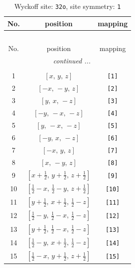 \documentclass[fleqn,8pt]{jsarticle}
\begin{document}
\renewcommand{\arraystretch}{1.2}
\begin{longtable}{ccc}
\caption{Wyckoff site: {\tt 32o}, site symmetry: {\tt 1}}
 \\
 \hline \hline
No. & position & mapping \\ \hline \endfirsthead

\multicolumn{2}{l}{\tablename\ \thetable{}} \\
 \hline \hline
No. & position & mapping \\ \hline \endhead

 \hline \hline
\multicolumn{2}{r}{\footnotesize\it continued ...} \\ \endfoot

 \hline \hline
\multicolumn{2}{r}{} \\ \endlastfoot

1 & $\left[ x,\, y,\, z \right]$ & {\tt [1]} \\ \hline
2 & $\left[ - x,\, - y,\, z \right]$ & {\tt [2]} \\ \hline
3 & $\left[ y,\, x,\, - z \right]$ & {\tt [3]} \\ \hline
4 & $\left[ - y,\, - x,\, - z \right]$ & {\tt [4]} \\ \hline
5 & $\left[ y,\, - x,\, - z \right]$ & {\tt [5]} \\ \hline
6 & $\left[ - y,\, x,\, - z \right]$ & {\tt [6]} \\ \hline
7 & $\left[ - x,\, y,\, z \right]$ & {\tt [7]} \\ \hline
8 & $\left[ x,\, - y,\, z \right]$ & {\tt [8]} \\ \hline
9 & $\left[ x + \frac{1}{2},\, y + \frac{1}{2},\, z + \frac{1}{2} \right]$ & {\tt [9]} \\ \hline
10 & $\left[ \frac{1}{2} - x,\, \frac{1}{2} - y,\, z + \frac{1}{2} \right]$ & {\tt [10]} \\ \hline
11 & $\left[ y + \frac{1}{2},\, x + \frac{1}{2},\, \frac{1}{2} - z \right]$ & {\tt [11]} \\ \hline
12 & $\left[ \frac{1}{2} - y,\, \frac{1}{2} - x,\, \frac{1}{2} - z \right]$ & {\tt [12]} \\ \hline
13 & $\left[ y + \frac{1}{2},\, \frac{1}{2} - x,\, \frac{1}{2} - z \right]$ & {\tt [13]} \\ \hline
14 & $\left[ \frac{1}{2} - y,\, x + \frac{1}{2},\, \frac{1}{2} - z \right]$ & {\tt [14]} \\ \hline
15 & $\left[ \frac{1}{2} - x,\, y + \frac{1}{2},\, z + \frac{1}{2} \right]$ & {\tt [15]} \\ \hline

\end{longtable}
\end{document}
